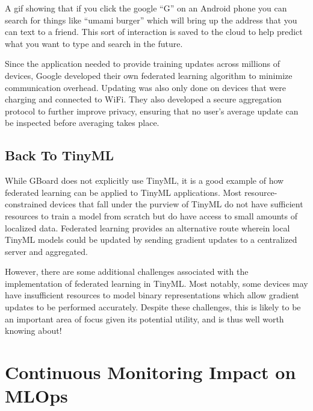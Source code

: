 {{{{{{{{

    A gif showing that if you click the google “G” on an Android phone you can search for things like “umami burger” which will bring up the address that you can text to a friend. This sort of interaction is saved to the cloud to help predict what you want to type and search in the future.
    
    Since the application needed to provide training updates across millions of devices, Google developed their own federated learning algorithm to minimize communication overhead. Updating was also only done on devices that were charging and connected to WiFi. They also developed a secure aggregation protocol to further improve privacy, ensuring that no user’s average update can be inspected before averaging takes place.
    
    \subsection{Back To TinyML}
    
    While GBoard does not explicitly use TinyML, it is a good example of how federated learning can be applied to TinyML applications. Most resource-constrained devices that fall under the purview of TinyML do not have sufficient resources to train a model from scratch but do have access to small amounts of localized data. Federated learning provides an alternative route wherein local TinyML models could be updated by sending gradient updates to a centralized server and aggregated.
    
    However, there are some additional challenges associated with the implementation of federated learning in TinyML. Most notably, some devices may have insufficient resources to model binary representations which allow gradient updates to be performed accurately. Despite these challenges, this is likely to be an important area of focus given its potential utility,  and is thus well worth knowing about!        
        
\section{Continuous Monitoring Impact on MLOps}

}}}}}}}}
